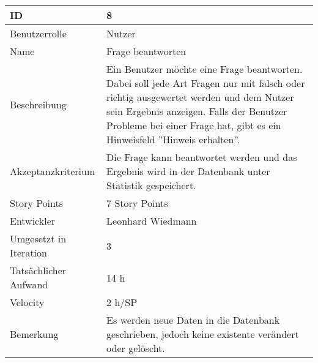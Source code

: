 \begin{tabularx}{\textwidth}{|p{}|X|}
	\hline
	ID & 8\\
	\hline
	Benutzerrolle & Nutzer\\
	\hline
	Name & Frage beantworten\\
	\hline
	Beschreibung & Ein Benutzer möchte eine Frage beantworten. Dabei soll jede Art Fragen nur mit falsch oder richtig ausgewertet werden und dem Nutzer sein Ergebnis anzeigen. Falls der Benutzer Probleme bei einer Frage hat, gibt es ein Hinweisfeld ''Hinweis erhalten''.\\
	\hline
	Akzeptanzkriterium & Die Frage kann beantwortet werden und das Ergebnis wird in der Datenbank unter Statistik gespeichert.\\
	\hline
	Story Points & 7 Story Points\\
	\hline
	Entwickler & Leonhard Wiedmann\\
	\hline
	Umgesetzt in Iteration & 3\\
	\hline
	Tatsächlicher Aufwand & 14 h\\
	\hline
	Velocity & 2 h/SP\\
	\hline
	Bemerkung & Es werden neue Daten in die Datenbank geschrieben, jedoch keine existente verändert oder gelöscht.\\
	\hline
\end{tabularx}
\vspace{20pt}
